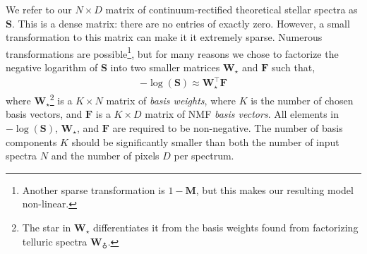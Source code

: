 \documentclass[modern]{aastex631}
\newcommand{\project}[1]{\textit{#1}}
\renewcommand{\vec}[1]{\mathbf{#1}}
\newcommand{\vectheta}{\boldsymbol{\theta}}
\newcommand{\vecalpha}{\boldsymbol{\alpha}}
\newcommand{\vecW}{\mathbf{W}} %
\newcommand{\vecH}{\mathbf{H}} %
\newcommand{\apogee}{\project{APOGEE}}
\newcommand{\transpose}{^\top}
\begin{document}
We refer to our $N \times D$ matrix of continuum-rectified theoretical stellar spectra as $\vec{S}$. This is a dense matrix: there are no entries of exactly zero. However, a small transformation to this matrix can make it it extremely sparse. Numerous transformations are possible\footnote{Another sparse transformation is $1 - \vec{M}$, but this makes our resulting model non-linear.}, but for many reasons we chose to factorize the negative logarithm of $\vec{S}$ into two smaller matrices $\vec{W}_\star$ and $\vec{F}$ such that,
\begin{eqnarray}
    \label{eq:nmf}
    -\log\left({\vec{S}}\right) \approx \vec{W}_\star\transpose\vec{F}
\end{eqnarray}
where $\vec{W}_\star$\footnote{The star in $\vec{W}_\star$ differentiates it from the basis weights found from factorizing telluric spectra $\vec{W}_\earth$.} is a $K \times N$ matrix of \emph{basis weights}, where $K$ is the number of chosen basis vectors, and $\vec{F}$ is a $K \times D$ matrix of NMF \emph{basis vectors}. All elements in $-\log\left({\vec{S}}\right)$, $\vec{W}_\star$, and $\vec{F}$ are required to be non-negative. The number of basis components $K$ should be significantly smaller than both the number of input spectra $N$ and the number of pixels $D$ per spectrum.\\%





\end{document}
